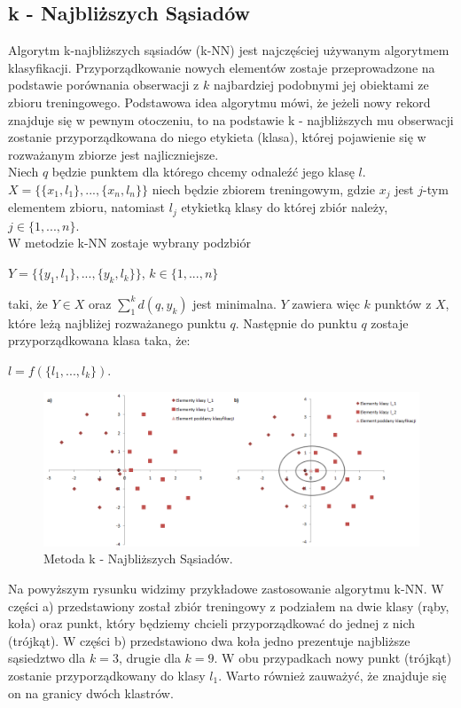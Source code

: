 \documentclass[12pt,a4paper]{report}
\begin{document}
\subsection{k - Najbliższych Sąsiadów}%
Algorytm k-najbliższych sąsiadów (k-NN) jest najczęściej używanym algorytmem klasyfikacji. 
Przyporządkowanie nowych elementów zostaje przeprowadzone na podstawie porównania obserwacji z $k$ najbardziej podobnymi jej obiektami ze zbioru treningowego. Podstawowa idea algorytmu mówi, że jeżeli nowy rekord znajduje się w pewnym otoczeniu, to na podstawie k - najbliższych mu obserwacji zostanie przyporządkowana do niego etykieta (klasa), której pojawienie się w rozważanym zbiorze jest najliczniejsze.
\\Niech $q$ będzie punktem dla którego chcemy odnaleźć jego klasę $l$. 
\\$X=\{\{x_1,l_1\},...,\{x_n,l_n\}\}$ niech będzie zbiorem treningowym, gdzie $x_j$ jest $j$-tym elementem zbioru, natomiast $l_j$ etykietką klasy do której zbiór należy, $j\in\{1,...,n\}$.
\\W metodzie k-NN zostaje wybrany podzbiór 
\begin{center}
$Y=\{\{y_1,l_1\},...,\{y_k,l_k\}\}$, $k\in\{1,...,n\}$
\end{center}
taki, że $Y \in X$ oraz $\sum_1^k d(q,y_k)$ jest minimalna. $Y$ zawiera więc $k$ punktów z $X$, które leżą najbliżej rozważanego punktu $q$. Następnie do punktu $q$ zostaje przyporządkowana klasa taka, że:
\begin{center}
$l=f(\{l_1,...,l_k\})$.
\end{center}
\begin{center}
\begin{figure}[H]
\centering
\includegraphics[scale=0.5]{kNN.PNG} 
\caption{Metoda k - Najbliższych Sąsiadów.}
\end{figure}
\end{center}
Na powyższym rysunku widzimy przykładowe zastosowanie algorytmu k-NN. W części a) przedstawiony został zbiór treningowy z podziałem na dwie klasy (rąby, koła) oraz punkt, który będziemy chcieli przyporządkować do jednej z nich (trójkąt). W części b) przedstawiono dwa koła jedno prezentuje najbliższe sąsiedztwo dla $k = 3$, drugie dla $k = 9$. W obu przypadkach nowy punkt (trójkąt) zostanie przyporządkowany do klasy $l_1$. Warto również zauważyć, że znajduje się on na granicy dwóch klastrów.
\end{document}
